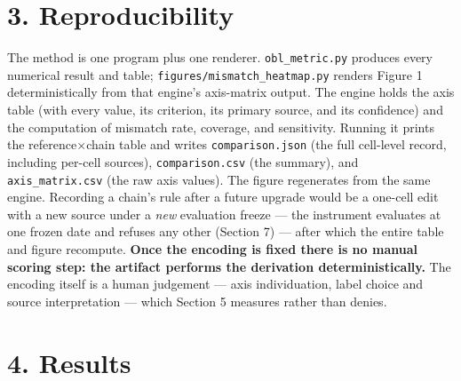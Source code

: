 \documentclass[
]{article}
\begin{document}
\section{3. Reproducibility}\label{reproducibility}

The method is one program plus one renderer. \texttt{obl\_metric.py}
produces every numerical result and table;
\texttt{figures/mismatch\_heatmap.py} renders Figure 1 deterministically
from that engine's axis-matrix output. The engine holds the axis table
(with every value, its criterion, its primary source, and its
confidence) and the computation of mismatch rate, coverage, and
sensitivity. Running it prints the reference\(\times\)chain table and
writes \texttt{comparison.json} (the full cell-level record, including
per-cell sources), \texttt{comparison.csv} (the summary), and
\texttt{axis\_matrix.csv} (the raw axis values). The figure regenerates
from the same engine. Recording a chain's rule after a future upgrade
would be a one-cell edit with a new source under a \emph{new} evaluation
freeze --- the instrument evaluates at one frozen date and refuses any
other (Section 7) --- after which the entire table and figure recompute.
\textbf{Once the encoding is fixed there is no manual scoring step: the
artifact performs the derivation deterministically.} The encoding itself
is a human judgement --- axis individuation, label choice and source
interpretation --- which Section 5 measures rather than denies.

\section{4. Results}\label{results}
\end{document}

